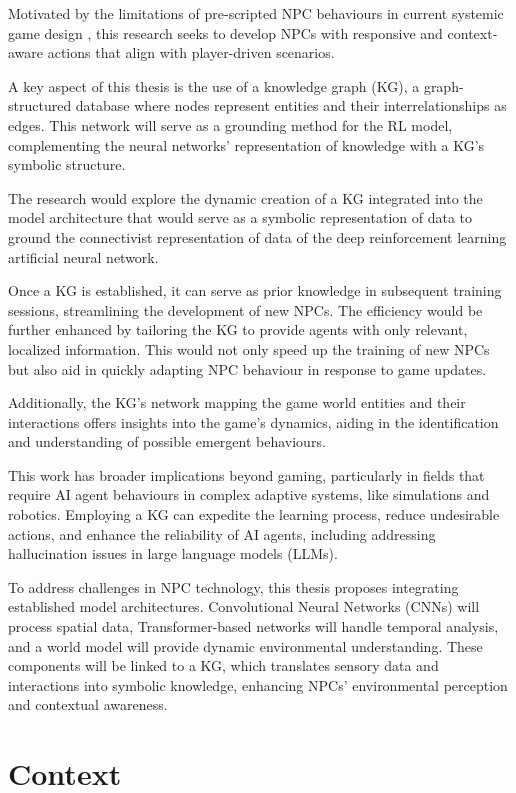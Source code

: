 Motivated by the limitations of pre-scripted NPC behaviours in current systemic game design \cite{Systemic_Games}, this research seeks to develop NPCs with responsive and context-aware actions that align with player-driven scenarios.

A key aspect of this thesis is the use of a knowledge graph (KG), a graph-structured database where nodes represent entities and their interrelationships as edges. This network will serve as a grounding method for the RL model, complementing the neural networks' representation of knowledge with a KG's symbolic structure.

The research would explore the dynamic creation of a KG integrated into the model architecture that would serve as a symbolic representation of data to ground the connectivist representation of data of the deep reinforcement learning artificial neural network.

Once a KG is established, it can serve as prior knowledge in subsequent training sessions, streamlining the development of new NPCs. The efficiency would be further enhanced by tailoring the KG to provide agents with only relevant, localized information. This would not only speed up the training of new NPCs but also aid in quickly adapting NPC behaviour in response to game updates.

Additionally, the KG's network mapping the game world entities and their interactions offers insights into the game's dynamics, aiding in the identification and understanding of possible emergent behaviours.

This work has broader implications beyond gaming, particularly in fields that require AI agent behaviours in complex adaptive systems, like simulations and robotics. Employing a KG can expedite the learning process, reduce undesirable actions, and enhance the reliability of AI agents, including addressing hallucination issues in large language models (LLMs).

To address challenges in NPC technology, this thesis proposes integrating established model architectures. Convolutional Neural Networks (CNNs) will process spatial data, Transformer-based networks will handle temporal analysis, and a world model will provide dynamic environmental understanding. These components will be linked to a KG, which translates sensory data and interactions into symbolic knowledge, enhancing NPCs' environmental perception and contextual awareness.


\section{Context}


